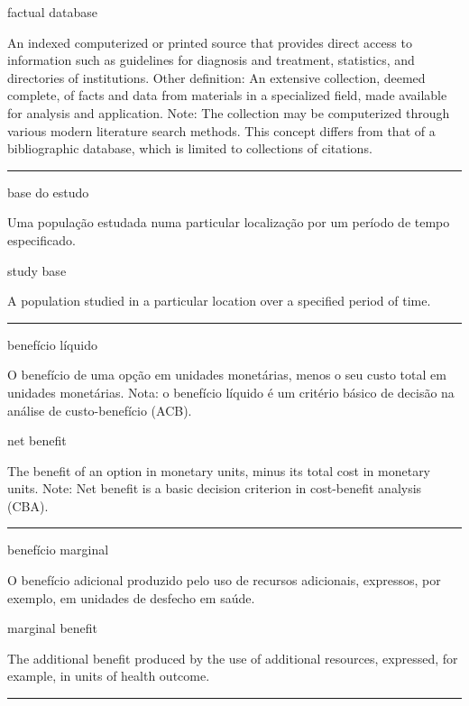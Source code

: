 \documentclass[
  openany]{book}
\begin{document}
factual database

An indexed computerized or printed source that provides direct access to information such as guidelines for diagnosis and treatment, statistics, and directories of institutions. Other definition: An extensive collection, deemed complete, of facts and data from materials in a specialized field, made available for analysis and application. Note: The collection may be computerized through various modern literature search methods. This concept differs from that of a bibliographic database, which is limited to collections of citations.

\begin{center}\rule{0.5\linewidth}{0.5pt}\end{center}

base do estudo

Uma população estudada numa particular localização por um período de tempo especificado.

study base

A population studied in a particular location over a specified period of time.

\begin{center}\rule{0.5\linewidth}{0.5pt}\end{center}

benefício líquido

O benefício de uma opção em unidades monetárias, menos o seu custo total em unidades monetárias. Nota: o benefício líquido é um critério básico de decisão na análise de custo-benefício (ACB).

net benefit

The benefit of an option in monetary units, minus its total cost in monetary units. Note: Net benefit is a basic decision criterion in cost-benefit analysis (CBA).

\begin{center}\rule{0.5\linewidth}{0.5pt}\end{center}

benefício marginal

O benefício adicional produzido pelo uso de recursos adicionais, expressos, por exemplo, em unidades de desfecho em saúde.

marginal benefit

The additional benefit produced by the use of additional resources, expressed, for example, in units of health outcome.

\begin{center}\rule{0.5\linewidth}{0.5pt}\end{center}
\end{document}
